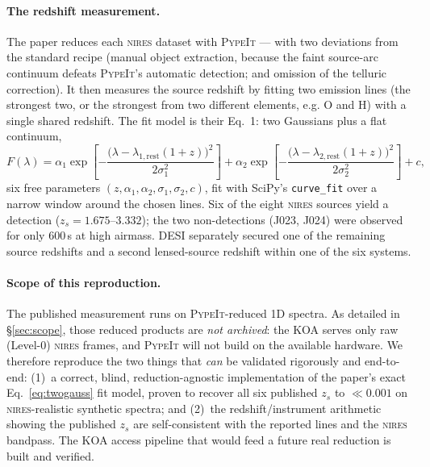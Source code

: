 \documentclass[11pt,letterpaper]{article}
\newcommand{\zs}{\ensuremath{z_s}}
\newcommand{\NIRES}{\textsc{nires}}
\begin{document}
\paragraph{The redshift measurement.} The paper reduces each \NIRES{}
dataset with \textsc{PypeIt} \citep{prochaska2020pypeit} --- with two
deviations from the standard recipe (manual object extraction, because
the faint source-arc continuum defeats \textsc{PypeIt}'s automatic
detection; and omission of the telluric correction). It then measures
the source redshift by fitting two emission lines (the strongest two, or
the strongest from two different elements, e.g. O and H) with a single
shared redshift. The fit model is their Eq.~1: two Gaussians plus a flat
continuum,
%
\begin{equation}
F(\lambda) =
  \alpha_1 \exp\!\left[ -\frac{\bigl(\lambda - \lambda_{1,\mathrm{rest}}
       (1+z)\bigr)^2}{2\sigma_1^2} \right]
  + \alpha_2 \exp\!\left[ -\frac{\bigl(\lambda - \lambda_{2,\mathrm{rest}}
       (1+z)\bigr)^2}{2\sigma_2^2} \right]
  + c,
\label{eq:twogauss}
\end{equation}
%
six free parameters $(z, \alpha_1, \alpha_2, \sigma_1, \sigma_2, c)$, fit
with SciPy's \texttt{curve\_fit} \citep{virtanen2020scipy} over a narrow
window around the chosen lines. Six of the eight \NIRES{} sources yield a
detection ($\zs = 1.675$--$3.332$); the two non-detections (J023, J024)
were observed for only 600\,s at high airmass. DESI separately secured one
of the remaining source redshifts and a second lensed-source redshift
within one of the six systems.

\paragraph{Scope of this reproduction.} The published measurement runs
on \textsc{PypeIt}-reduced 1D spectra. As detailed in
\S\ref{sec:scope}, those reduced products are \emph{not archived}: the
KOA serves only raw (Level-0) \NIRES{} frames, and \textsc{PypeIt} will
not build on the available hardware. We therefore reproduce the two
things that \emph{can} be validated rigorously and end-to-end:
(1)~a correct, blind, reduction-agnostic implementation of the paper's
exact Eq.~\ref{eq:twogauss} fit model, proven to recover all six
published \zs{} to $\ll 0.001$ on \NIRES-realistic synthetic spectra; and
(2)~the redshift/instrument arithmetic showing the published \zs{} are
self-consistent with the reported lines and the \NIRES{} bandpass. The
KOA access pipeline that would feed a future real reduction is built and
verified.
\end{document}
